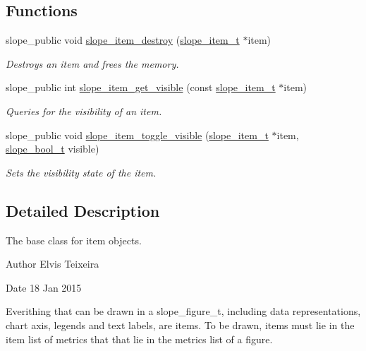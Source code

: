 \subsection*{Functions}
\begin{DoxyCompactItemize}
\item 
slope\+\_\+public void \hyperlink{group__Item_gaf048bd8c425893229133befa61831fd6}{slope\+\_\+item\+\_\+destroy} (\hyperlink{group__Item_ga2616141f0e164a876049da51ea3a8646}{slope\+\_\+item\+\_\+t} $\ast$item)
\begin{DoxyCompactList}\small\item\em Destroys an item and frees the memory. \end{DoxyCompactList}\item 
slope\+\_\+public int \hyperlink{group__Item_gaf9e09ab9591e1a2c3c41441f206ffd38}{slope\+\_\+item\+\_\+get\+\_\+visible} (const \hyperlink{group__Item_ga2616141f0e164a876049da51ea3a8646}{slope\+\_\+item\+\_\+t} $\ast$item)
\begin{DoxyCompactList}\small\item\em Queries for the visibility of an item. \end{DoxyCompactList}\item 
\hypertarget{group__Item_ga68b3c890dee408f284bb9c243b9dd0e9}{slope\+\_\+public void \hyperlink{group__Item_ga68b3c890dee408f284bb9c243b9dd0e9}{slope\+\_\+item\+\_\+toggle\+\_\+visible} (\hyperlink{group__Item_ga2616141f0e164a876049da51ea3a8646}{slope\+\_\+item\+\_\+t} $\ast$item, \hyperlink{group__Primitives_gac55afa016ca777119a6c343d1655d558}{slope\+\_\+bool\+\_\+t} visible)}\label{group__Item_ga68b3c890dee408f284bb9c243b9dd0e9}

\begin{DoxyCompactList}\small\item\em Sets the visibility state of the item. \end{DoxyCompactList}\end{DoxyCompactItemize}


\subsection{Detailed Description}
The base class for item objects. 

\begin{DoxyAuthor}{Author}
Elvis Teixeira 
\end{DoxyAuthor}
\begin{DoxyDate}{Date}
18 Jan 2015
\end{DoxyDate}
Everithing that can be drawn in a slope\+\_\+figure\+\_\+t, including data representations, chart axis, legends and text labels, are items. To be drawn, items must lie in the item list of metrics that that lie in the metrics list of a figure. 


